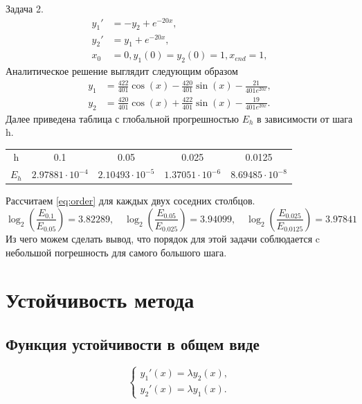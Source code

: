 \documentclass[a4paper,article,14pt]{extarticle}
\begin{document}
Задача 2.
\begin{equation}
\begin{aligned}
    y_{1}' &= -y_{2} + e^{-20x}, \\
    y_{2}' &= y_{1} + e^{-20x}, \\
    x_{0} &= 0, y_{1}(0) = y_{2}(0) = 1, x_{end} = 1,
\end{aligned}
\end{equation}
Аналитическое решение выглядит следующим образом
\begin{equation}
\begin{aligned}
    y_{1} &= \frac{422}{401} \cos(x) - \frac{420}{401} \sin(x) - \frac{21}{401 e^{20x}}, \\
    y_{2} &= \frac{420}{401} \cos(x) + \frac{422}{401} \sin(x) - \frac{19}{401 e^{20x}}.
\end{aligned}
\end{equation}
Далее приведена таблица с глобальной прогрешностью $E_{h}$ в зависимости от шага h.
\begin{center}
\begin{tabular}{ |c|c|c|c|c| } 
\hline
h & 0.1& 0.05 & 0.025 & 0.0125 \\ 
$E_{h}$ & $2.97881\cdot10^{-4}$ & $2.10493\cdot10^{-5}$ & $1.37051\cdot10^{-6}$ & $8.69485\cdot10^{-8}$ \\ 
\hline
\end{tabular}
\end{center}
Рассчитаем \ref{eq:order} для каждых двух соседних столбцов.
\begin{equation}
\log_{2}(\frac{E_{0.1}}{E_{0.05}}) = 3.82289 , \quad \log_{2}(\frac{E_{0.05}}{E_{0.025}}) = 3.94099 , \quad \log_{2}(\frac{E_{0.025}}{E_{0.0125}}) = 3.97841
\end{equation}
Из чего можем сделать вывод, что порядок для этой задачи соблюдается c небольшой погрешность для самого большого шага.
\pagebreak

\section{Устойчивость метода}
\subsection{Функция устойчивости в общем виде}
\begin{equation}
\begin{cases}
    y_{1}'(x) = \lambda y_{2}(x), \\
    y_{2}'(x) = \lambda y_{1}(x).
\end{cases}
\label{eq:test_system}
\end{equation}
\end{document}
